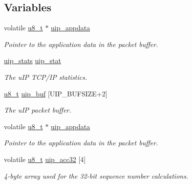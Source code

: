 \subsection*{Variables}
\begin{CompactItemize}
\item 
volatile \hyperlink{a00070_ge081489b4906f65a3cb18e9fbe9f8d23}{u8\_\-t} $\ast$ \hyperlink{a00059_ge71ae1aa130be22a5f028e76d8d1e31e}{uip\_\-appdata}
\begin{CompactList}\small\item\em Pointer to the application data in the packet buffer. \item\end{CompactList}\item 
\hyperlink{a00031}{uip\_\-stats} \hyperlink{a00059_g9ee50a40597e67fce96541ab56c3b712}{uip\_\-stat}
\begin{CompactList}\small\item\em The u\-IP TCP/IP statistics. \item\end{CompactList}\item 
\hyperlink{a00070_ge081489b4906f65a3cb18e9fbe9f8d23}{u8\_\-t} \hyperlink{a00059_gb81e78f890dbbee50c533a9734b74fd9}{uip\_\-buf} \mbox{[}UIP\_\-BUFSIZE+2\mbox{]}
\begin{CompactList}\small\item\em The u\-IP packet buffer. \item\end{CompactList}\item 
volatile \hyperlink{a00070_ge081489b4906f65a3cb18e9fbe9f8d23}{u8\_\-t} $\ast$ \hyperlink{a00059_ge71ae1aa130be22a5f028e76d8d1e31e}{uip\_\-appdata}
\begin{CompactList}\small\item\em Pointer to the application data in the packet buffer. \item\end{CompactList}\item 
\hypertarget{a00059_g838108341703d67d15fc09e0808c2561}{
volatile \hyperlink{a00070_ge081489b4906f65a3cb18e9fbe9f8d23}{u8\_\-t} \hyperlink{a00059_g838108341703d67d15fc09e0808c2561}{uip\_\-acc32} \mbox{[}4\mbox{]}}
\label{a00059_g838108341703d67d15fc09e0808c2561}

\begin{CompactList}\small\item\em 4-byte array used for the 32-bit sequence number calculations. \item\end{CompactList}\end{CompactItemize}


